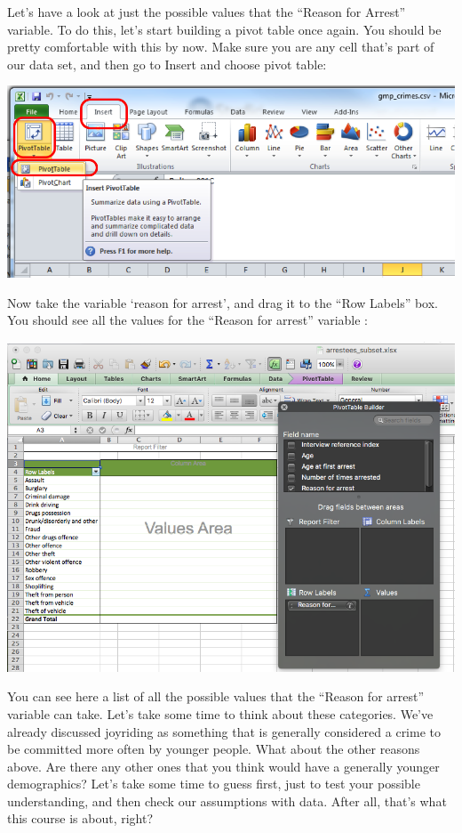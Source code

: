 \documentclass[
]{book}
\begin{document}
Let's have a look at just the possible values that the ``Reason for Arrest'' variable. To do this, let's start building a pivot table once again. You should be pretty comfortable with this by now. Make sure you are any cell that's part of our data set, and then go to Insert
and choose pivot table:

\includegraphics{imgs/click_pivot.png}

Now take the variable `reason for arrest', and drag it to the ``Row Labels'' box. You should see all the values for the ``Reason for arrest'' variable :

\includegraphics{imgs/reason_arr_values.png}

You can see here a list of all the possible values that the ``Reason for arrest'' variable can take. Let's take some time to think about these categories. We've already discussed joyriding as something that is generally considered a crime to be committed more often by younger people. What about the other reasons above. Are there any other ones that you think would have a generally younger demographics? Let's take some time to guess first, just to test your possible understanding, and then check our assumptions with data. After all, that's what this course is about, right?
\end{document}
